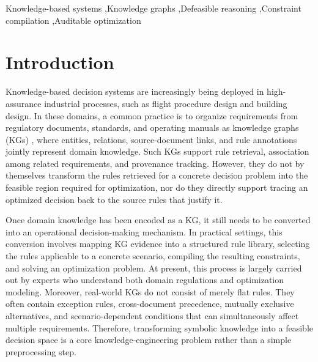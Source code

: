 ﻿\documentclass[a4paper,fleqn]{cas-dc}
\begin{document}
\begin{keywords}
Knowledge-based systems \sep Knowledge graphs \sep Defeasible reasoning \sep Constraint compilation \sep Auditable optimization
\end{keywords}

\hfuzz=1000pt
\maketitle
\hfuzz=0.1pt

\section{Introduction}
\label{sec:intro}

Knowledge-based decision systems are increasingly being deployed in
high-assurance industrial processes, such as flight procedure design and
building design. In these domains, a common practice is to organize
requirements from regulatory documents, standards, and operating manuals as
knowledge graphs (KGs) \cite{horrocks2004swrl,pan2017exploiting}, where
entities, relations, source-document links, and rule annotations jointly
represent domain knowledge. Such KGs support rule retrieval, association among
related requirements, and provenance tracking. However, they do not by
themselves transform the rules retrieved for a concrete decision problem into
the feasible region required for optimization, nor do they directly support
tracing an optimized decision back to the source rules that justify it.

Once domain knowledge has been encoded as a KG, it still needs to be converted
into an operational decision-making mechanism. In practical settings, this
conversion involves mapping KG evidence into a structured rule library,
selecting the rules applicable to a concrete scenario, compiling the resulting
constraints, and solving an optimization problem. At present, this process is
largely carried out by experts who understand both domain regulations and
optimization modeling. Moreover, real-world KGs do not consist of merely flat
rules. They often contain exception rules, cross-document precedence,
mutually exclusive alternatives, and scenario-dependent conditions that can
simultaneously affect multiple requirements. Therefore, transforming symbolic
knowledge into a feasible decision space is a core knowledge-engineering
problem rather than a simple preprocessing step.
\end{document}
